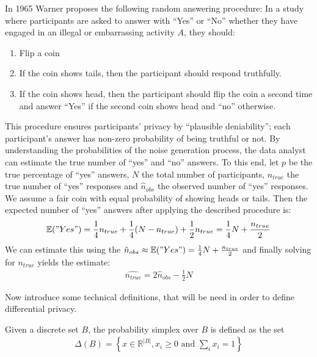 \begin{ex} \label{ex:rand_resp}
    In 1965 Warner \parencite{stan65rr} proposes the following random answering procedure: In a study where participants are asked to answer with ``Yes'' or ``No'' whether they have engaged in an illegal or embarrassing activity $A$, they should:
    \begin{enumerate}
        \item Flip a coin
        \item If the coin shows tails, then the participant should respond truthfully.
        \item If the coin shows head, then the participant should flip the coin a second time and answer ``Yes'' if the second coin shows head and ``no'' otherwise.
    \end{enumerate}
    This procedure ensures participants' privacy by ``plausible deniability''; each participant's answer has non-zero probability of being truthful or not. By understanding the probabilities of the noise generation process, the data analyst can estimate the true number of ``yes'' and ``no'' answers. To this end, let $p$ be the true percentage of ``yes'' answers, $N$ the total number of participants, $n_{true}$ the true number of ``yes'' responses and $\hat{n}_{obs}$ the observed number of ``yes'' responses. We assume a fair coin with equal probability of showing heads or tails. Then the expected number of ``yes'' answers after applying the described procedure is:
    \begin{align}
        \mathbb{E}("Yes") = \frac{1}{4} n_{true} + \frac{1}{4} (N-n_{true}) + \frac{1}{2} n_{true} = \frac{1}{4} N + \frac{n_{true}}{2}
    \end{align}
    We can estimate this using the $\hat{n}_{obs} \approx \mathbb{E}("Yes") = \frac{1}{4} N + \frac{n_{true}}{2}$ and finally solving for $n_{true}$ yields the estimate:
    \begin{align}
        \hat{n_{true}} = 2 \hat{n}_{obs} - \frac{1}{2} N
    \end{align}
\end{ex}

Now introduce some technical definitions, that will be need in order to define differential privacy.

\begin{definition}
    Given a discrete set $B$, the probability simplex over $B$ is defined as the set
    \begin{align}
        \Delta(B) = \left\{ x \in \mathbb{R}^{|B|}, x_i \ge 0 \text{ and } \sum_i x_i = 1  \right\}
    \end{align}
\end{definition}

